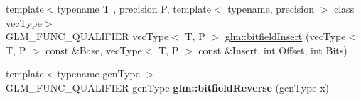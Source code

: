 \begin{DoxyCompactItemize}
\item 
{\footnotesize template$<$typename T , precision P, template$<$ typename, precision $>$ class vec\-Type$>$ }\\G\-L\-M\-\_\-\-F\-U\-N\-C\-\_\-\-Q\-U\-A\-L\-I\-F\-I\-E\-R vec\-Type$<$ T, P $>$ \hyperlink{group__core__func__integer_ga5681dfac9239beb1b8bd995e3c6496d7}{glm\-::bitfield\-Insert} (vec\-Type$<$ T, P $>$ const \&Base, vec\-Type$<$ T, P $>$ const \&Insert, int Offset, int Bits)
\item 
\hypertarget{namespaceglm_abaf011115ec2807a589806911d97c10e}{{\footnotesize template$<$typename gen\-Type $>$ }\\G\-L\-M\-\_\-\-F\-U\-N\-C\-\_\-\-Q\-U\-A\-L\-I\-F\-I\-E\-R gen\-Type {\bfseries glm\-::bitfield\-Reverse} (gen\-Type x)}\label{namespaceglm_abaf011115ec2807a589806911d97c10e}


\end{DoxyCompactItemize}
